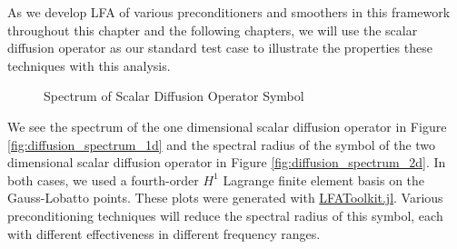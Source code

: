 As we develop LFA of various preconditioners and smoothers in this framework throughout this chapter and the following chapters, we will use the scalar diffusion operator as our standard test case to illustrate the properties these techniques with this analysis.

\begin{figure}[!h]
  \centering
  \hfill
  \caption{Spectrum of Scalar Diffusion Operator Symbol}
\end{figure}

We see the spectrum of the one dimensional scalar diffusion operator in Figure \ref{fig:diffusion_spectrum_1d} and the spectral radius of the symbol of the two dimensional scalar diffusion operator in Figure \ref{fig:diffusion_spectrum_2d}.
In both cases, we used a fourth-order $H^1$ Lagrange finite element basis on the Gauss-Lobatto points.
These plots were generated with \href{https://www.github.com/jeremylt/LFAToolkit.jl}{LFAToolkit.jl}.
Various preconditioning techniques will reduce the spectral radius of this symbol, each with different effectiveness in different frequency ranges.